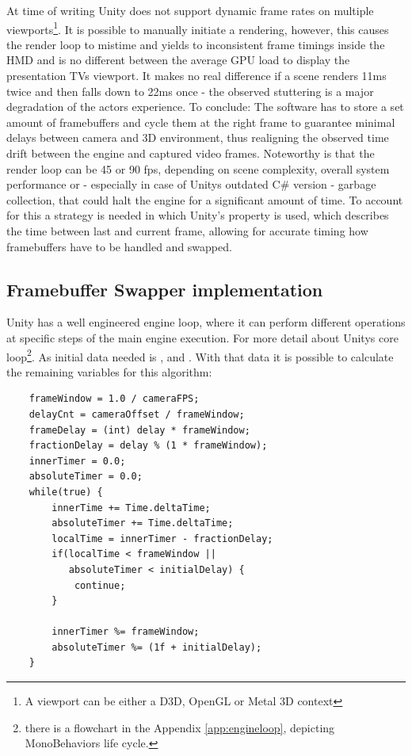 At time of writing Unity does not support dynamic frame rates on multiple 
viewports\footnote{A viewport can be either a D3D, OpenGL or Metal 3D context}.
\newline
It is possible to manually initiate a rendering, however, this causes the 
render loop to mistime and yields to inconsistent frame timings inside the HMD 
and is no different between the average GPU load to display the presentation 
TVs viewport.  It makes no real difference 
if a scene renders 11ms twice and then falls down to 22ms once - the observed 
stuttering is a major degradation of the actors experience.
\newline
To conclude: The software has to store a set amount of \gls{framebuffer}s and 
cycle them at the right frame to guarantee minimal delays between camera and 3D 
environment, thus realigning the observed time drift between the engine and 
captured video frames.
\newline
Noteworthy is that the render loop can be 45 or 90 fps, depending on scene 
complexity, overall system performance or - especially in case of Unitys 
outdated C\# version - garbage collection, that could halt the engine for a 
significant amount of time. To account for this a strategy is needed in which 
Unity's  property is used, which describes the time 
between last and current frame, allowing for accurate timing how framebuffers 
have to be handled and swapped.

\subsection{Framebuffer Swapper implementation}

Unity has a well engineered engine loop, where it can perform different 
operations at specific steps of the main engine execution. For more detail 
about Unitys core loop\footnote{there is a flowchart in the Appendix 
\ref{app:engineloop}, depicting MonoBehaviors life cycle.}. As 
initial data needed is ,  and 
. With that data it is possible to calculate the remaining 
variables for this algorithm:

\begin{lstlisting}
	frameWindow = 1.0 / cameraFPS;
	delayCnt = cameraOffset / frameWindow;
	frameDelay = (int) delay * frameWindow;
	fractionDelay = delay % (1 * frameWindow);
	innerTimer = 0.0;
	absoluteTimer = 0.0;
	while(true) {
		innerTime += Time.deltaTime;
		absoluteTimer += Time.deltaTime;
		localTime = innerTimer - fractionDelay;
		if(localTime < frameWindow ||
		   absoluteTimer < initialDelay) {
			continue;
		}
		
		innerTimer %= frameWindow;
		absoluteTimer %= (1f + initialDelay);
	}
\end{lstlisting}

